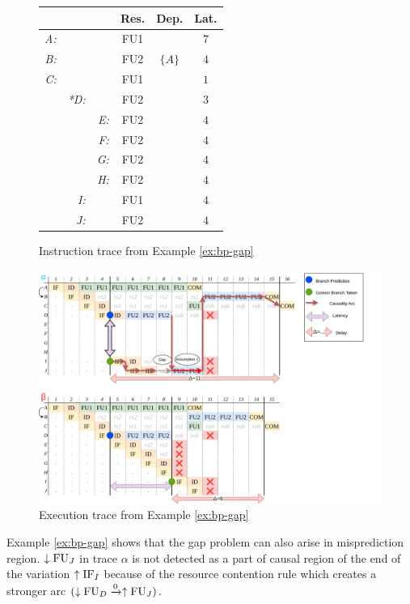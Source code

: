 \begin{figure}[H]
    \centering
    \begin{tabular}{rrr|ccc}
    &  &  & Res. & Dep. & Lat. \\ \hline
    \textit{A:} &  &  & FU1 &  & $7$ \\
    \textit{B:} &  &  & FU2 & $\{A\}$ & $4$ \\
    \textit{C:} &  &  & FU1 &  & $1$ \\
    & \textit{*D:} &  & FU2 &  & $3$ \\
    &  & \textit{E:} & FU2 &  & $4$ \\
    &  & \textit{F:} & FU2 &  & $4$ \\
    &  & \textit{G:} & FU2 &  & $4$ \\
    &  & \textit{H:} & FU2 &  & $4$ \\
    & \textit{I:} &  & FU1 &  & $4$ \\
    & \textit{J:} &  & FU2 &  & $4$ \\
    \end{tabular}    

    \caption{Instruction trace from Example \ref{ex:bp-gap}}
    \label{fig:bp-gap-input}
\end{figure}

\begin{figure}[H]
    \centering
    \includegraphics[width=\textwidth]{figures/bp-gap.png}
    \caption{Execution trace from Example \ref{ex:bp-gap}}
    \label{fig:bp-gap-trace}
\end{figure}

Example \ref{ex:bp-gap} shows that the gap problem can also arise in misprediction region. $\downarrow\mathrm{FU}_J$ in trace $\alpha$ is not detected as a part of causal region of the end of the variation $\uparrow\mathrm{IF}_I$ because of the resource contention rule which creates a stronger arc $(\downarrow\mathrm{FU}_D \xrightarrow{0} \uparrow\mathrm{FU}_J)$.


